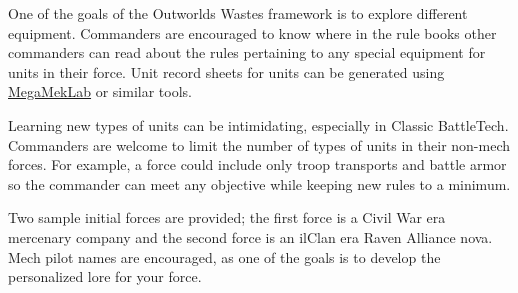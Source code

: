 \documentclass{article}
\begin{document}
One of the goals of the Outworlds Wastes framework is to explore different equipment.
Commanders are encouraged to know where in the rule books other commanders can read about the rules pertaining to any special equipment for units in their force.
Unit record sheets for units can be generated using \href{https://megamek.org}{MegaMekLab} or similar tools.

Learning new types of units can be intimidating, especially in Classic BattleTech.
Commanders are welcome to limit the number of types of units in their non-mech forces.
For example, a force could include only troop transports and battle armor so the commander can meet any objective while keeping new rules to a minimum.

\newpage

Two sample initial forces are provided; the first force is a Civil War era mercenary company and the second force is an ilClan era Raven Alliance nova.
Mech pilot names are encouraged, as one of the goals is to develop the personalized lore for your force.
\end{document}
